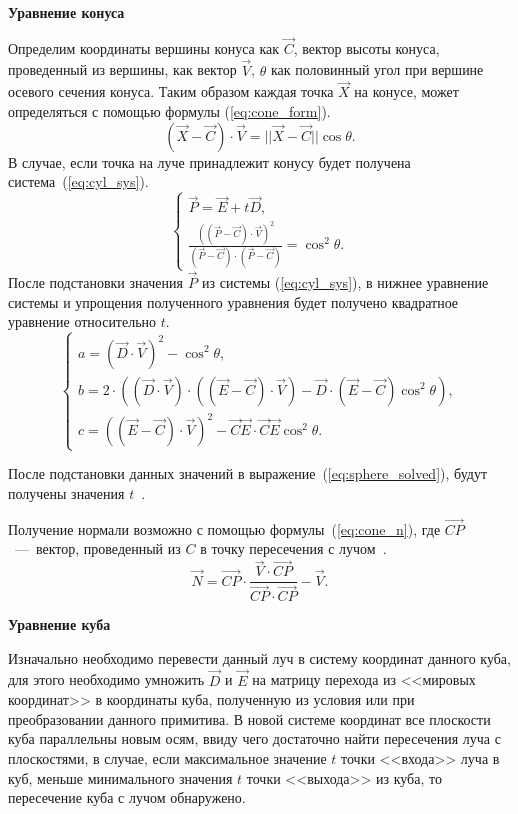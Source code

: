 \textbf{Уравнение конуса}

Определим координаты вершины конуса как $\vec{C}$, вектор высоты конуса, проведенный из вершины, как вектор $\vec{V}$, $\theta$ как половинный угол при вершине осевого сечения конуса. Таким образом
каждая точка $\vec{X}$ на конусе, может определяться с помощью формулы (\ref{eq:cone_form}).
\begin{equation}
	(\vec{X} - \vec{C}) \cdot \vec{V} = ||\vec{X} - \vec{C}||\cos{\theta}.
	\label{eq:cone_form}
\end{equation}
В случае, если точка на луче принадлежит конусу будет получена система~(\ref{eq:cyl_sys}).
\begin{equation}
	\begin{cases}
		\vec{P} = \vec{E} + t\vec{D}, \\
		\frac{((\vec{P} - \vec{C}) \cdot \vec{V})^{2}}{(\vec{P} - \vec{C}) \cdot (\vec{P} - \vec{C})} = {\cos^{2}{\theta}}.
	\end{cases}
	\label{eq:cyl_sys}
\end{equation}
После подстановки значения $\vec{P}$ из системы (\ref{eq:cyl_sys}), в нижнее уравнение системы и упрощения полученного уравнения будет получено квадратное уравнение относительно $t$.
\begin{equation}
	\begin{cases}
	a = (\vec{D} \cdot \vec{V})^{2} - \cos^{2}{\theta}, \\
	b = 2 \cdot ((\vec{D} \cdot \vec{V}) \cdot ((\vec{E} - \vec{C}) \cdot \vec{V}) - \vec{D} \cdot (\vec{E} - \vec{C}){\cos^{2}{\theta}}), \\
	
	c = ((\vec{E} - \vec{C}) \cdot \vec{V})^{2} - \vec{C}\vec{E} \cdot \vec{C}\vec{E}\cos^{2}{\theta}.
	\end{cases}
\end{equation}

После подстановки данных значений в выражение~(\ref{eq:sphere_solved}), будут получены значения $t$~\cite{cone_inter}. 

Получение нормали возможно с помощью формулы~(\ref{eq:cone_n}), где $\vec{CP}$~---~вектор, проведенный из $C$ в точку пересечения с лучом~\cite{cone_inter}.
\begin{equation}
	\vec{N} = \vec{CP} \cdot \frac{\vec{V} \cdot \vec{CP}}{\vec{CP} \cdot \vec{CP}} - \vec{V}.
	\label{eq:cone_n}
\end{equation} 

\textbf{Уравнение куба}

Изначально необходимо перевести данный луч в систему координат данного куба,
для этого необходимо умножить $\vec{D}$ и $\vec{E}$ на матрицу перехода из <<мировых координат>> в координаты куба, полученную из условия или при преобразовании данного примитива. В новой системе координат все плоскости куба параллельны новым осям, ввиду чего достаточно найти пересечения луча с плоскостями, в случае, если максимальное значение $t$ точки <<входа>> луча в куб, меньше минимального значения $t$ точки <<выхода>> из куба, то пересечение куба с лучом обнаружено.

